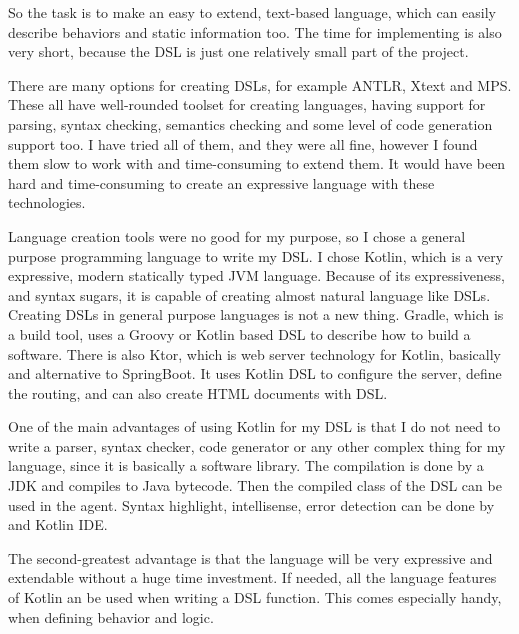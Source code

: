 So the task is to make an easy to extend, text-based language, which can easily describe behaviors and static information too. The time for implementing is also very short, because the DSL is just one relatively small part of the project.

There are many options for creating DSLs, for example ANTLR, Xtext and MPS. These all have well-rounded toolset for creating languages, having support for parsing, syntax checking, semantics checking and some level of code generation support too. I have tried all of them, and they were all fine, however I found them slow to work with and time-consuming to extend them. It would have been hard and time-consuming to create an expressive language with these technologies.

Language creation tools were no good for my purpose, so I chose a general purpose programming language to write my DSL. I chose Kotlin, which is a very expressive, modern statically typed JVM language. Because of its expressiveness, and syntax sugars, it is capable of creating almost natural language like DSLs. Creating DSLs in general purpose languages is not a new thing. Gradle, which is a build tool, uses a Groovy or Kotlin based DSL to describe how to build a software. There is also Ktor, which is web server technology for Kotlin, basically and alternative to SpringBoot. It uses Kotlin DSL to configure the server, define the routing, and can also create HTML documents with DSL.

One of the main advantages of using Kotlin for my DSL is that I do not need to write a parser, syntax checker, code generator or any other complex thing for my language, since it is basically a software library. The compilation is done by a JDK and compiles to Java bytecode. Then the compiled class of the DSL can be used in the agent. Syntax highlight, intellisense, error detection can be done by and Kotlin IDE.

The second-greatest advantage is that the language will be very expressive and extendable without a huge time investment. If needed, all the language features of Kotlin an be used when writing a DSL function. This comes especially handy, when defining behavior and logic.




